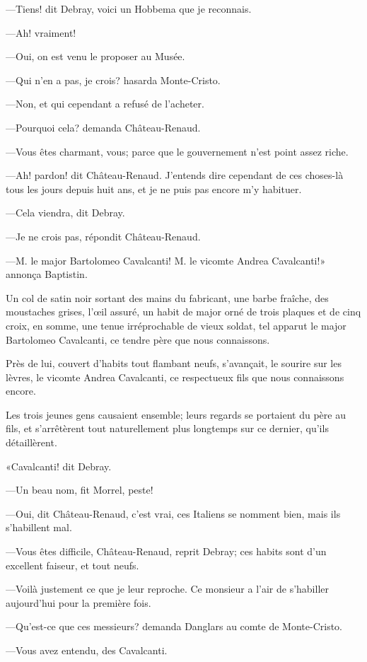 —Tiens! dit Debray, voici un Hobbema que je reconnais. 

—Ah! vraiment! 

—Oui, on est venu le proposer au Musée. 

—Qui n'en a pas, je crois? hasarda Monte-Cristo. 

—Non, et qui cependant a refusé de l'acheter. 

—Pourquoi cela? demanda Château-Renaud. 

—Vous êtes charmant, vous; parce que le gouvernement n'est point assez riche. 

—Ah! pardon! dit Château-Renaud. J'entends dire cependant de ces choses-là tous les jours depuis huit ans, et je ne puis pas encore m'y habituer. 

—Cela viendra, dit Debray. 

—Je ne crois pas, répondit Château-Renaud. 

—M. le major Bartolomeo Cavalcanti! M. le vicomte Andrea Cavalcanti!» annonça Baptistin.  

Un col de satin noir sortant des mains du fabricant, une barbe fraîche, des moustaches grises, l'œil assuré, un habit de major orné de trois plaques et de cinq croix, en somme, une tenue irréprochable de vieux soldat, tel apparut le major Bartolomeo Cavalcanti, ce tendre père que nous connaissons. 

Près de lui, couvert d'habits tout flambant neufs, s'avançait, le sourire sur les lèvres, le vicomte Andrea Cavalcanti, ce respectueux fils que nous connaissons encore. 

Les trois jeunes gens causaient ensemble; leurs regards se portaient du père au fils, et s'arrêtèrent tout naturellement plus longtemps sur ce dernier, qu'ils détaillèrent. 

«Cavalcanti! dit Debray. 

—Un beau nom, fit Morrel, peste! 

—Oui, dit Château-Renaud, c'est vrai, ces Italiens se nomment bien, mais ils s'habillent mal. 

—Vous êtes difficile, Château-Renaud, reprit Debray; ces habits sont d'un excellent faiseur, et tout neufs. 

—Voilà justement ce que je leur reproche. Ce monsieur a l'air de s'habiller aujourd'hui pour la première fois. 

—Qu'est-ce que ces messieurs? demanda Danglars au comte de Monte-Cristo. 

—Vous avez entendu, des Cavalcanti.  

